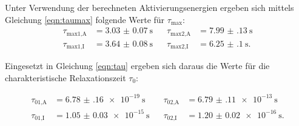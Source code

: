 Unter Verwendung der berechneten Aktivierungsenergien ergeben sich mittels Gleichung \ref{eqn:taumax}
folgende Werte für $\tau_\text{max}$:
\begin{align*}
\tau_\text{max1,A}&=\SI{3.03(7)}{\s}\;\;\;&\tau_\text{max2,A}&=\SI{7.99(13)}{\s}\\
\tau_\text{max1,I}&=\SI{3.64(8)}{\s}\;\;\;&\tau_\text{max2,I}&=\SI{6.25(10)}{\s}.
\end{align*}

Eingesetzt in Gleichung \ref{eqn:tau} ergeben sich daraus die Werte für
die charakteristische Relaxationszeit $\tau_0$:

\begin{align*}
\tau_\text{01,A}&=\SI{6.78(16)e-19}{\s}\;\;\;&\tau_\text{02,A}&=\SI{6.79(11)e-13}{\s}\\
\tau_\text{01,I}&=\SI{1.05(3)e-15}{\s}\;\;\;&\tau_\text{02,I}&=\SI{1.20(2)e-16}{\s}.
\end{align*}

